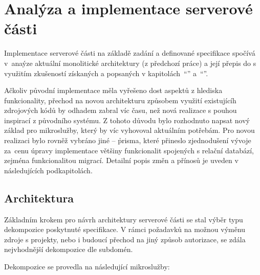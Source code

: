 \chapter{Analýza a implementace serverové části}\label{ch:server}


Implementace serverové části na základě zadání a definované specifikace  spočívá v~anaýze aktuální monolitické architektury (z předchozí práce) a její přepis do  s využitím zkušeností získaných a popsaných v kapitolách~\enquote{} a~\enquote{}.

Ačkoliv původní implementace měla vyřešeno dost aspektů z hlediska funkcionality, přechod na novou architekturu způsobem využití existujícíh zdrojových kódů by odhadem zabral víc času, než nová realizace s pouhou inspirací z původního systému.
Z tohoto důvodu bylo rozhodnuto napsat nový základ pro mikroslužby, který by víc vyhovoval aktuálním potřebám.
Pro novou realizaci bylo rovněž vybráno jiné  – \h{prisma}, které přineslo zjednodušení vývoje za~cenu úpravy implementace většiny funkcionalit spojených s relační databází, zejména funkcionalitou migrací.
Detailní popis změn a přínosů je uveden v následujících podkapitolách.

\newpage



\section{Architektura}\label{sec:server-arch}

Základním krokem pro návrh architektury serverové části se stal výběr typu dekompozice poskytnuté specifikace.
V rámci požadavků na možnou výměnu zdroje s projekty, nebo i budoucí přechod na jiný způsob autorizace, se zdála nejvhodnější dekompozice dle subdomén.

Dekompozice se provedla na následující mikroslužby:

